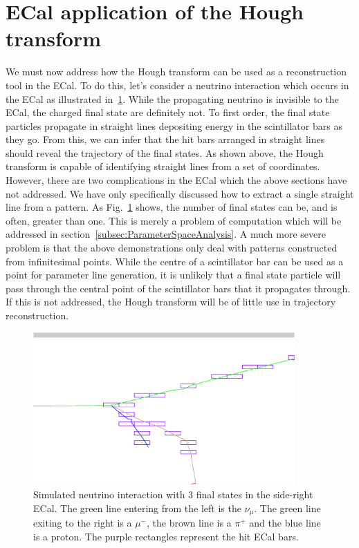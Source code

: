 \section{ECal application of the Hough transform}
\label{sec:ECalApplicationHoughTransform}
We must now address how the Hough transform can be used as a reconstruction tool in the ECal.  To do this, let's consider a neutrino interaction which occurs in the ECal as illustrated in~\ref{fig:3StateInteractionNoReconstruction}.  While the propagating neutrino is invisible to the ECal, the charged final state are definitely not.  To first order, the final state particles propagate in straight lines depositing energy in the scintillator bars as they go.  From this, we can infer that the hit bars arranged in straight lines should reveal the trajectory of the final states.  As shown above, the Hough transform is capable of identifying straight lines from a set of coordinates.  However, there are two complications in the ECal which the above sections have not addressed.  We have only specifically discussed how to extract a single straight line from a pattern.  As Fig.~\ref{fig:3StateInteractionNoReconstruction} shows, the number of final states can be, and is often, greater than one.  This is merely a problem of computation which will be addressed in section~\ref{subsec:ParameterSpaceAnalysis}.  A much more severe problem is that the above demonstrations only deal with patterns constructed from infinitesimal points.  While the centre of a scintillator bar can be used as a point for parameter line generation, it is unlikely that a final state particle will pass through the central point of the scintillator bars that it propagates through.  If this is not addressed, the Hough transform will be of little use in trajectory reconstruction.
\begin{figure}
  \centering
  \includegraphics[width=10cm]{images/hough_transform/3StateInteraction_SideLeftECal_NoReconstruction.eps}
  \caption{Simulated neutrino interaction with 3 final states in the side-right ECal.  The green line entering from the left is the $\nu_\mu$.  The green line exiting to the right is a $\mu^{-}$, the brown line is a $\pi^+$ and the blue line is a proton.  The purple rectangles represent the hit ECal bars.}
  \label{fig:3StateInteractionNoReconstruction}
\end{figure}

